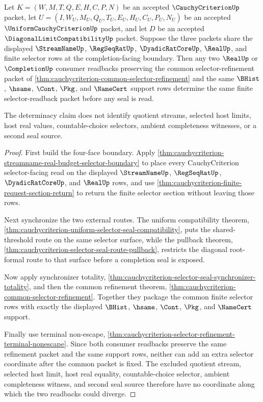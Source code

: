 \begin{theorem}
\label{thm:cauchycriterion-four-face-selector-readback-determinacy}
Let $K=(W,M,T,Q,E,H,C,P,N)$ be an accepted $\CauchyCriterionUp$ packet, let $U=(I,W_U,M_U,Q_U,T_U,E_U,H_U,C_U,P_U,N_U)$ be an accepted $\UniformCauchyCriterionUp$ packet, and let $D$ be an accepted $\DiagonalLimitCompatibilityUp$ packet. Suppose the three packets share the displayed $\StreamNameUp$, $\RegSeqRatUp$, $\DyadicRatCoreUp$, $\RealUp$, and finite selector rows at the completion-facing boundary. Then any two $\RealUp$ or $\CompletionUp$ consumer readbacks preserving the common selector-refinement packet of \autoref{thm:cauchycriterion-common-selector-refinement} and the same $\BHist$, $\hsame$, $\Cont$, $\Pkg$, and $\NameCert$ support rows determine the same finite selector-readback packet before any seal is read.

The determinacy claim does not identify quotient streams, selected host limits, host real values, countable-choice selectors, ambient completeness witnesses, or a second seal source.
\end{theorem}
\begin{proof}
First build the four-face boundary. Apply \autoref{thm:cauchycriterion-streamname-real-budget-selector-boundary} to place every CauchyCriterion selector-facing read on the displayed $\StreamNameUp$, $\RegSeqRatUp$, $\DyadicRatCoreUp$, and $\RealUp$ rows, and use \autoref{thm:cauchycriterion-finite-request-section-return} to return the finite selector section without leaving those rows.

Next synchronize the two external routes. The uniform compatibility theorem, \autoref{thm:cauchycriterion-uniform-selector-seal-compatibility}, puts the shared-threshold route on the same selector surface, while the pullback theorem, \autoref{thm:cauchycriterion-selector-seal-route-pullback}, restricts the diagonal root-formal route to that surface before a completion seal is exposed.

Now apply synchronizer totality, \autoref{thm:cauchycriterion-selector-seal-synchronizer-totality}, and then the common refinement theorem, \autoref{thm:cauchycriterion-common-selector-refinement}. Together they package the common finite selector rows with exactly the displayed $\BHist$, $\hsame$, $\Cont$, $\Pkg$, and $\NameCert$ support.

Finally use terminal non-escape, \autoref{thm:cauchycriterion-selector-refinement-terminal-nonescape}. Since both consumer readbacks preserve the same refinement packet and the same support rows, neither can add an extra selector coordinate after the common packet is fixed. The excluded quotient stream, selected host limit, host real equality, countable-choice selector, ambient completeness witness, and second seal source therefore have no coordinate along which the two readbacks could diverge.
\end{proof}

